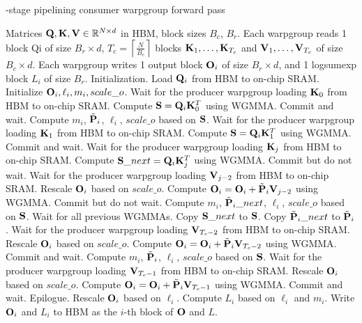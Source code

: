 \begin{algorithm}[H]
    \caption{\small\label{alg:flash3_3_stage_wgmma}-stage pipelining consumer warpgroup forward pass}
    \begin{algorithmic}[1]
      \REQUIRE Matrices $\mathbf{Q}, \mathbf{K}, \mathbf{V} \in \mathbb{R}^{N \times d}$ in HBM, block sizes $B_c$, $B_r$.
      Each warpgroup reads 1 block Qi of size $B_r \times d$, $T_c = \left\lceil \frac{N}{B_c} \right\rceil$ blocks $\mathbf{K}_1, \dots, \mathbf{K}_{T_c}$ and
      $\mathbf{V}_1, \dots, \mathbf{V}_{T_c}$ of size $B_c \times d$.
      Each warpgroup writes 1 output block $\mathbf{O}_i$ of size $B_r \times d$, and 1 logsumexp block $L_i$ of size $B_r$.
      \STATE Initialization. Load $\mathbf{Q}_i$ from HBM to on-chip SRAM.
      Initialize $\mathbf{O}_{i}, \ell_{i}, m_{i}, scale\_o$.
      \STATE Wait for the producer warpgroup loading $\mathbf{K}_0$ from HBM to on-chip SRAM.
      \STATE Compute $\mathbf{S} = \mathbf{Q}_i \mathbf{K}_0^T$ using WGMMA. Commit and wait.
      \STATE Compute $m_{i}$, $\tilde{\mathbf{P}}_{i}$, $\ell_{i}$, $scale\_o$ based on $\mathbf{S}$.
      \STATE Wait for the producer warpgroup loading $\mathbf{K}_1$ from HBM to on-chip SRAM.
      \STATE Compute $\mathbf{S} = \mathbf{Q}_i \mathbf{K}_1^T$ using WGMMA. Commit and wait.
        \STATE Wait for the producer warpgroup loading $\mathbf{K}_j$ from HBM to on-chip SRAM.
        \STATE Compute $\mathbf{S}\_next = \mathbf{Q}_i \mathbf{K}_{j}^T$ using WGMMA. Commit but do not wait.
        \STATE Wait for the producer warpgroup loading $\mathbf{V}_{j-2}$ from HBM to on-chip SRAM.
        \STATE Rescale $\mathbf{O}_{i}$ based on $scale\_o$.
        \STATE Compute
        $\mathbf{O}_{i} = \mathbf{O}_{i} + \tilde{\mathbf{P}}_{i} \mathbf{V}_{j-2}$ using WGMMA. Commit but do not wait.
        \STATE Compute $m_{i}$, $\tilde{\mathbf{P}}_{i}\_next$, $\ell_{i}$, $scale\_o$ based on $\mathbf{S}$.
        \STATE Wait for all previous WGMMAs.
        \STATE Copy $\mathbf{S}\_next$ to $\mathbf{S}$.
        \STATE Copy $\tilde{\mathbf{P}}_{i}\_next$ to $\tilde{\mathbf{P}}_{i}$.
      \ENDFOR
      \STATE Wait for the producer warpgroup loading $\mathbf{V}_{T_c-2}$ from HBM to on-chip SRAM.
      \STATE Rescale $\mathbf{O}_{i}$ based on $scale\_o$.
      \STATE Compute
      $\mathbf{O}_{i} = \mathbf{O}_{i} + \tilde{\mathbf{P}}_{i} \mathbf{V}_{T_c-2}$ using WGMMA. Commit and wait.
      \STATE Compute $m_{i}$, $\tilde{\mathbf{P}}_{i}$, $\ell_{i}$, $scale\_o$ based on $\mathbf{S}$.
      \STATE Wait for the producer warpgroup loading $\mathbf{V}_{T_c-1}$ from HBM to on-chip SRAM.
      \STATE Rescale $\mathbf{O}_{i}$ based on $scale\_o$.
      \STATE Compute
      $\mathbf{O}_{i} = \mathbf{O}_{i} + \tilde{\mathbf{P}}_{i} \mathbf{V}_{T_c-1}$ using WGMMA. Commit and wait.
      \STATE Epilogue. Rescale $\mathbf{O}_{i}$ based on $\ell_{i}$. Compute $L_{i}$ based on $\ell_{i}$ and $m_{i}$. Write $\mathbf{O}_{i}$ and $L_{i}$ to HBM as the $i$-th block of $\mathbf{O}$ and $L$.
    \end{algorithmic}
  \end{algorithm}

